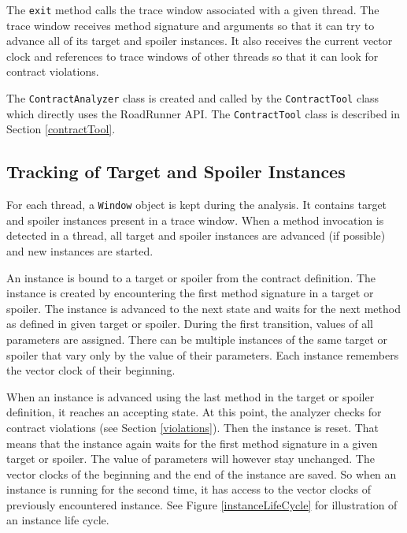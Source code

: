 The \texttt{exit} method calls the trace window associated with a given thread.
The trace window receives method signature and arguments so that it can try to
advance all of its target and spoiler instances. It also receives the current
vector clock and references to trace windows of other threads so that it can
look for contract violations.

The \texttt{ContractAnalyzer} class is created and called by the
\texttt{ContractTool} class which directly uses the RoadRunner API. The
\texttt{ContractTool} class is described in Section \ref{contractTool}.

\subsection{Tracking of Target and Spoiler Instances}

For each thread, a \texttt{Window} object is kept during the analysis. It
contains target and spoiler instances present in a trace window. When a method
invocation is detected in a thread, all target and spoiler instances are
advanced (if possible) and new instances are started.

An instance is bound to a target or spoiler from the contract definition. The
instance is created by encountering the first method signature in a target or
spoiler. The instance is advanced to the next state and waits for the next
method as defined in given target or spoiler. During the first transition,
values of all parameters are assigned. There can be multiple instances of the
same target or spoiler that vary only by the value of their parameters. Each
instance remembers the vector clock of their beginning.

When an instance is advanced using the last method in the target or spoiler
definition, it reaches an accepting state. At this point, the analyzer checks
for contract violations (see Section \ref{violations}). Then the instance is
reset. That means that the instance again waits for the first method signature
in a given target or spoiler. The value of parameters will however stay
unchanged. The vector clocks of the beginning and the end of the instance are
saved. So when an instance is running for the second time, it has access to the
vector clocks of previously encountered instance. See Figure
\ref{instanceLifeCycle} for illustration of an instance life cycle.

